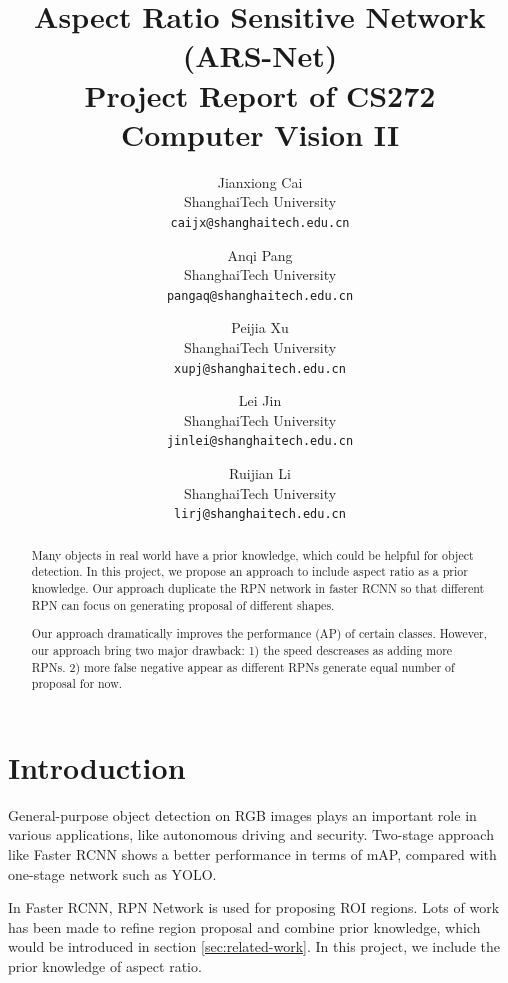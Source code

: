 \documentclass[10pt,twocolumn,letterpaper]{article}
\begin{document}
\title{Aspect Ratio Sensitive Network (ARS-Net) \\ 
\small Project Report of CS272 Computer Vision II
}

\author{Jianxiong Cai\\
ShanghaiTech University\\
{\tt\small caijx@shanghaitech.edu.cn}
\and
Anqi Pang\\
ShanghaiTech University\\
{\tt\small pangaq@shanghaitech.edu.cn}
\and
Peijia Xu\\
ShanghaiTech University\\
{\tt\small xupj@shanghaitech.edu.cn}
\and
Lei Jin\\
ShanghaiTech University\\
{\tt\small jinlei@shanghaitech.edu.cn}
\and
Ruijian Li\\
ShanghaiTech University\\
{\tt\small lirj@shanghaitech.edu.cn}
}


\maketitle

\begin{abstract}
\par
Many objects in real world have a prior knowledge, which could be helpful for object detection. In this project, we propose an approach to include aspect ratio as a prior knowledge. Our approach duplicate the RPN network in faster RCNN \cite{fasterRCNN} so that different RPN can focus on generating proposal of different shapes.
\par
Our approach dramatically improves the performance (AP) of certain classes. However, our approach bring two major drawback: 1) the speed descreases as adding more RPNs. 2) more false negative appear as different RPNs generate equal number of proposal for now.

\end{abstract}

\section{Introduction}
\par
General-purpose object detection on RGB images plays an important role in various applications, like autonomous driving and security. Two-stage approach like Faster RCNN \cite{fasterRCNN} shows a better performance in terms of mAP, compared with one-stage network such as YOLO.
\par
In Faster RCNN, RPN Network is used for proposing ROI regions. Lots of work has been made to refine region proposal and combine prior knowledge, which would be introduced in section \ref{sec:related-work}. In this project, we include the prior knowledge of aspect ratio.
\end{document}
